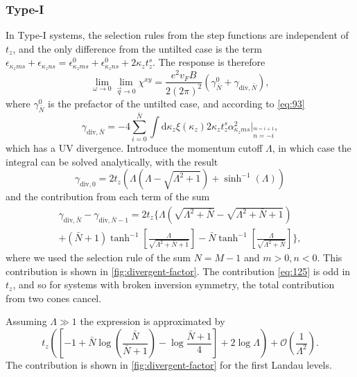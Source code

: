\subsubsection{Type-I}
In Type-I systems, the selection rules from the step functions are independent of \( t_z \), and the only difference from the untilted case is the term \( \epsilon_{\kappa_z m s} + \epsilon_{\kappa_z n s} = \epsilon^0_{\kappa_z m s} + \epsilon^0_{\kappa_z n s} + 2 \kappa_z t^s_z \).
The response is therefore
\begin{equation}
  \label{eq:122}
  \lim_{\omega \to 0} \lim_{\vec{q} \to 0} \chi^{xy} = \frac{e^2v_F B}{2 (2\pi)^2} (\gamma_{\bar{N}}^0 + \gamma_{\text{div}, {\bar{N}}}),
\end{equation}
where \( \gamma_{\bar{N}}^0 \) is the prefactor of the untilted case, and according to \cref{eq:93}
\begin{equation}
  \label{eq:123}
  \gamma_{\text{div}, {\bar{N}}} = -4 \sum\limits_{i=0}^{{\bar{N}}} \int \mathrm{d} \kappa_z \xi(\kappa_z)
  2 \kappa_z t^s_z \alpha_{\kappa_z m s}^2 \Big|_{\overset{m=i+1}{n=-i}},
\end{equation}
which has a UV divergence.
Introduce the momentum cutoff \( \Lambda \), in which case the integral can be solved analytically, with the result
\begin{equation}
  \label{eq:124}
  \gamma_{\text{div}, 0} = 2 t_z \left(\Lambda  \left(\Lambda -\sqrt{\Lambda ^2+1}\right)+\sinh ^{-1}(\Lambda
   )\right)
\end{equation}
and the contribution from each term of the sum
\begin{multline}
  \gamma_{\text{div}, {\bar{N}}} - \gamma_{\text{div}, {\bar{N}}-1} =
  2 t_z
  \Bigg\{
    \Lambda\left(\sqrt{\Lambda^2 + \bar{N}} - \sqrt{\Lambda^2 + \bar{N} + 1}  \right)\\
    + (\bar{N} + 1) \tanh^{-1}\left[\frac{\Lambda}{\sqrt{\Lambda^2 + \bar{N} + 1} } \right]
    - \bar{N} \tanh^{-1}\left[\frac{\Lambda}{\sqrt{\Lambda^2 + \bar{N}}}\right]
    \Bigg\},
    \label{eq:125}
\end{multline}
where we used the selection rule of the sum \( N = M - 1 \) and \( m>0, n<0 \).
This contribution is shown in \cref{fig:divergent-factor}.
The contribution \eqref{eq:125} is odd in \( t_z \), and so for systems with broken inversion symmetry, the total contribution from two cones cancel.

Assuming \( \Lambda \gg 1 \) the expression is approximated by
\begin{equation}
  \label{eq:126}
  t_z
  \left(
    \left[
  -1 + \bar{N} \log\left(\frac{\bar{N}}{\bar{N}+1}\right) - \log \frac{\bar{N}+1}{4}
  \right]
 + 2 \log\Lambda
\right) + \mathcal{O}\left(\frac{1}{\Lambda^2}\right).
\end{equation}
The contribution is shown in \cref{fig:divergent-factor} for the first Landau levels.



